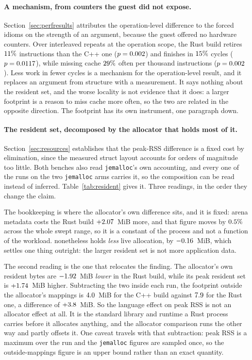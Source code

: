 \documentclass[english,oneside,a4paper,censored,csm,software-track-2020]{HYthesisML}
\begin{document}
\paragraph{A mechanism, from counters the guest did not expose.}
Section~\ref{sec:perfresults} attributes the operation-level difference to the forced idioms on
the strength of an argument, because the guest offered no hardware counters. Over
\BmCounterRepeats{} interleaved repeats at the operation scope, the Rust build retires
$11\%$ \BmInstrDeltaDir{} instructions than the C++ one ($p=0.002$) and
finishes in $15\%$ \BmCycleDeltaDir{} cycles ($p=0.0117$), while missing cache
$29\%$ \BmMissDeltaDir{} often per thousand instructions ($p=0.002$). Less work
in fewer cycles is a mechanism for the operation-level result, and it replaces an argument from
structure with a measurement. It says nothing about the resident set, and the worse locality is not
evidence that it does: a larger footprint is a reason to miss cache more often, so the two are
related in the opposite direction. The footprint has its own instrument, one paragraph down.

\paragraph{The resident set, decomposed by the allocator that holds most of it.}
Section~\ref{sec:resources} establishes that the peak-RSS difference is a fixed cost by
elimination, since the measured struct layout accounts for orders of magnitude too little. Both
benches also read \texttt{jemalloc}'s own accounting, and every one of the \BmJeRuns{} runs on the
two \texttt{jemalloc} arms carries it, so the composition can be read instead of inferred.
Table~\ref{tab:resident} gives it. Three readings, in the order they change the claim.

The bookkeeping is where the allocator's own difference sits, and it is fixed: arena metadata costs
the Rust build $+2.07$~MiB more, and that figure moves by $0.5\%$ across the
whole swept range, so it is a constant of the process and not a function of the workload.
\BmJeLiveLower{} nonetheless holds \emph{less} live allocation, by $-0.16$~MiB, which
settles one thing outright: the larger resident set is not more application data.

The second reading is the one that relocates the finding. The allocator's own resident bytes are
$-1.92$~MiB \emph{lower} in the Rust build, while its peak resident set is
$+1.74$~MiB higher. Subtracting the two inside each run, the footprint outside the
allocator's mappings is $4.0$~MiB for the C++ build against $7.9$ for the
Rust one, a difference of $+3.8$~MiB. So the language effect on peak RSS is not an
allocator effect at all. It is the standard library and runtime a Rust process carries before it
allocates anything, and the allocator comparison runs the other way and partly offsets it. One
caveat travels with that subtraction: peak RSS is a maximum over the run and the
\texttt{jemalloc} figures are sampled once, so the outside-mappings figure is an upper bound rather
than an exact quantity.
\end{document}
